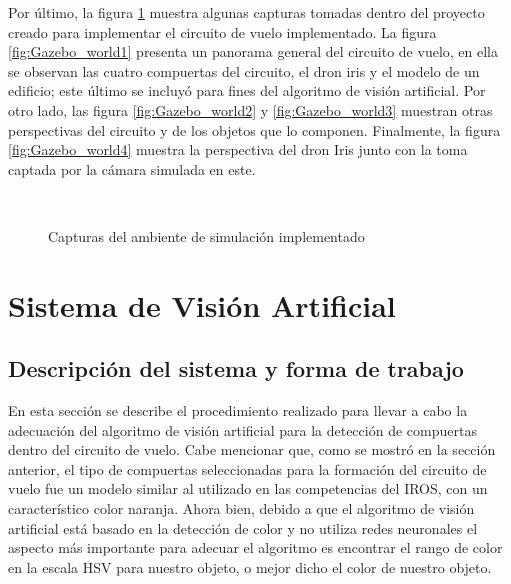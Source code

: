 Por último, la figura \ref{fig:Gazebo_worlds} muestra algunas capturas tomadas dentro del proyecto creado para implementar el circuito de vuelo implementado. La figura \ref{fig:Gazebo_world1} presenta un panorama general del circuito de vuelo, en ella se observan las cuatro compuertas del circuito, el dron iris y el modelo de un edificio; este último se incluyó para fines del algoritmo de visión artificial. Por otro lado, las figura \ref{fig:Gazebo_world2} y \ref{fig:Gazebo_world3}  muestran otras perspectivas del circuito y de los objetos que lo componen. Finalmente, la figura \ref{fig:Gazebo_world4} muestra la perspectiva del dron Iris junto con la toma captada por la cámara simulada en este.

\begin{figure}[ht]
    \centering
    \hfill
    \\
    \hfill
    \hfill

    \caption{Capturas del ambiente de simulación implementado}
    \label{fig:Gazebo_worlds}
\end{figure}

\newpage


\section{Sistema de Visión Artificial}

\subsection{Descripción del sistema y forma de trabajo}
En esta sección se describe el procedimiento realizado para llevar a cabo la adecuación del algoritmo de visión artificial para la detección de compuertas dentro del circuito de vuelo. Cabe mencionar que, como se mostró en la sección anterior, el tipo de compuertas seleccionadas para la formación del circuito de vuelo fue un modelo similar al utilizado en las competencias del IROS, con un característico color naranja. Ahora bien, debido a que el algoritmo de visión artificial está basado en la detección de color y no utiliza redes neuronales el aspecto más importante para adecuar el algoritmo es encontrar el rango de color en la escala HSV para nuestro objeto, o mejor dicho el color de nuestro objeto.

